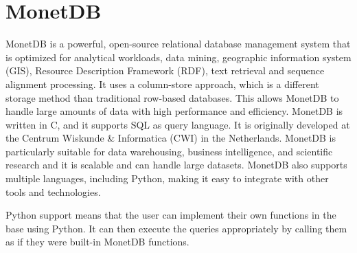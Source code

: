 \section{MonetDB}
\label{sec:monet}


MonetDB is a powerful, open-source relational database management system that is optimized for analytical workloads, data mining, 
geographic information system (GIS), Resource Description Framework (RDF), text retrieval and sequence alignment processing. 
It uses a column-store approach, which is a different storage method than traditional row-based databases. 
This allows MonetDB to handle large amounts of data with high performance and efficiency. 
MonetDB is written in C, and it supports SQL as query language. It is originally developed at the Centrum Wiskunde \& Informatica (CWI) in the Netherlands.
MonetDB is particularly suitable for data warehousing, business intelligence, and scientific research and it is scalable and can handle large datasets. 
MonetDB also supports multiple languages, including Python, making it easy to integrate with other tools and technologies.

Python support means that the user can implement their own functions in the base using Python. 
It can then execute the queries appropriately by calling them as if they were built-in MonetDB functions.
